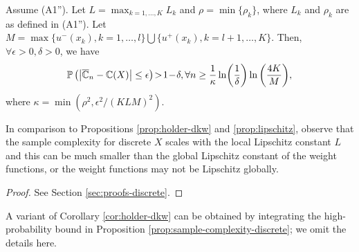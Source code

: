 \begin{proposition}
\label{prop:sample-complexity-discrete}
Assume (A1''). Let $L=\max_{k=1,\ldots,K} L_k$ and $\rho =\min\{\rho_k\}$, where $L_k$ and $\rho_k$ are as defined in (A1'').
Let $M=\max\{u^{-}(x_k), k=1,\ldots,l\} \bigcup \{u^{+}(x_k), k=l+1,\ldots,K\}$.
Then, $\forall \epsilon>0,\delta >0$, we have 
\begin{align*}
\mathbb{P}\left( \left|
\overline {\mathbb{C}}_n -\mathbb{C}(X)
\right| \leq \epsilon \right) \! > \! 1\!-\!\delta, \forall n \ge \frac{1}{\kappa}\ln\!\left(\frac{1}{\delta}\right) \ln\left(\frac{4K}{M}\right)\!, 
\end{align*}
where $\kappa=\min(\rho^2, \epsilon^2/(KLM)^2)$.
\end{proposition}

In comparison to Propositions \ref{prop:holder-dkw} and \ref{prop:lipschitz}, 
observe that the sample complexity for discrete $X$ scales with the local Lipschitz constant $L$ and this can be much smaller than the global Lipschitz constant of the weight functions, or the weight functions may not be Lipschitz globally.  

\begin{proof}
 See Section \ref{sec:proofs-discrete}.
\end{proof}

A variant of Corollary \ref{cor:holder-dkw} can be obtained by integrating the high-probability bound in Proposition \ref{prop:sample-complexity-discrete}; we omit the details here.

